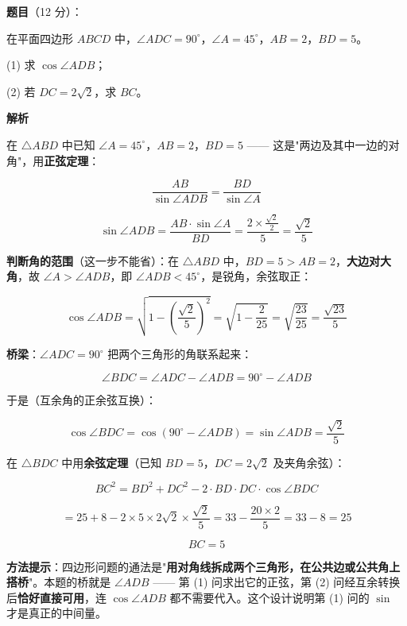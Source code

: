 \begin{answer}

\textbf{题目}（12 分）：

在平面四边形 $ABCD$ 中，$\angle ADC=90^\circ$，$\angle A=45^\circ$，$AB=2$，$BD=5$。

  (1) 求 $\cos\angle ADB$；

  (2) 若 $DC=2\sqrt2$，求 $BC$。

\textbf{解析}


在 $\triangle ABD$ 中已知 $\angle A=45^\circ$，$AB=2$，$BD=5$ —— 这是"两边及其中一边的对角"，用\textbf{正弦定理}：

\nopagebreak[4]
\[\frac{AB}{\sin\angle ADB}=\frac{BD}{\sin\angle A}\]

\nopagebreak[4]
\[\sin\angle ADB=\frac{AB\cdot\sin\angle A}{BD}=\frac{2\times\frac{\sqrt2}2}5=\frac{\sqrt2}5\]

\textbf{判断角的范围}（这一步不能省）：在 $\triangle ABD$ 中，$BD=5>AB=2$，\textbf{大边对大角}，故 $\angle A>\angle ADB$，即 $\angle ADB<45^\circ$，是锐角，余弦取正：

\nopagebreak[4]
\[\cos\angle ADB=\sqrt{1-\left(\frac{\sqrt2}5\right)^{2}}=\sqrt{1-\frac2{25}}=\sqrt{\frac{23}{25}}=\frac{\sqrt{23}}5\]


\textbf{桥梁}：$\angle ADC=90^\circ$ 把两个三角形的角联系起来：

\nopagebreak[4]
\[\angle BDC=\angle ADC-\angle ADB=90^\circ-\angle ADB\]

于是（互余角的正余弦互换）：

\nopagebreak[4]
\[\cos\angle BDC=\cos\left(90^\circ-\angle ADB\right)=\sin\angle ADB=\frac{\sqrt2}5\]

在 $\triangle BDC$ 中用\textbf{余弦定理}（已知 $BD=5$，$DC=2\sqrt2$ 及夹角余弦）：

\nopagebreak[4]
\[BC^{2}=BD^{2}+DC^{2}-2\cdot BD\cdot DC\cdot\cos\angle BDC\]

\nopagebreak[4]
\[=25+8-2\times5\times2\sqrt2\times\frac{\sqrt2}5=33-\frac{20\times2}5=33-8=25\]

\nopagebreak[4]
\[BC=5\]

\begin{gktip}
\textbf{方法提示}：四边形问题的通法是"\textbf{用对角线拆成两个三角形，在公共边或公共角上搭桥}"。本题的桥就是 $\angle ADB$ —— 第 (1) 问求出它的正弦，第 (2) 问经互余转换后\textbf{恰好直接可用}，连 $\cos\angle ADB$ 都不需要代入。这个设计说明第 (1) 问的 $\sin$ 才是真正的中间量。
\end{gktip}



\par\medskip

\end{answer}
